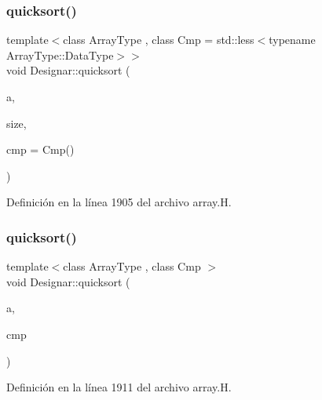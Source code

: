 \mbox{\label{namespace_designar_a3b84da2b14868b20993ec9687e3c29c4}} 
\subsubsection{\texorpdfstring{quicksort()}{quicksort()}\hspace{0.1cm}{\footnotesize\ttfamily [12/14]}}
{\footnotesize\ttfamily template$<$class Array\+Type , class Cmp  = std\+::less$<$typename Array\+Type\+::\+Data\+Type$>$$>$ \\
void Designar\+::quicksort (\begin{DoxyParamCaption}\item[{Array\+Type \&}]{a,  }\item[{\hyperlink{namespace_designar_a9d113d66a39e82b73727c72cd3a52f73}{lint\+\_\+t}}]{size,  }\item[{Cmp \&\&}]{cmp = {\ttfamily Cmp()} }\end{DoxyParamCaption})\hspace{0.3cm}{\ttfamily [inline]}}



Definición en la línea 1905 del archivo array.\+H.

\mbox{\label{namespace_designar_ae6156420cc82f38302cc7b7c837275b1}} 
\subsubsection{\texorpdfstring{quicksort()}{quicksort()}\hspace{0.1cm}{\footnotesize\ttfamily [13/14]}}
{\footnotesize\ttfamily template$<$class Array\+Type , class Cmp $>$ \\
void Designar\+::quicksort (\begin{DoxyParamCaption}\item[{Array\+Type \&}]{a,  }\item[{Cmp \&}]{cmp }\end{DoxyParamCaption})\hspace{0.3cm}{\ttfamily [inline]}}



Definición en la línea 1911 del archivo array.\+H.

\mbox{\label{namespace_designar_a75b9270f723888eb32e0b8f78032f0df}} 
